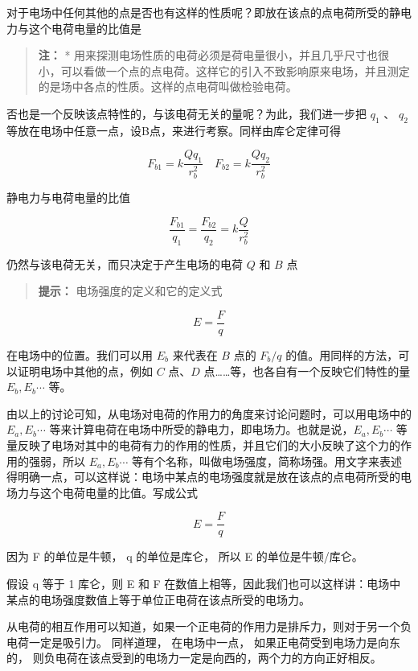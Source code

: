 对于电场中任何其他的点是否也有这样的性质呢？即放在该点的点电荷所受的静电力与这个电荷电量的比值是

\begin{quote}
\textbf{注：} *
用来探测电场性质的电荷必须是荷电量很小，并且几乎尺寸也很小，可以看做一个点的点电荷。这样它的引入不致影响原来电场，并且测定的是场中各点的性质。这样的点电荷叫做检验电荷。
\end{quote}

否也是一个反映该点特性的，与该电荷无关的量呢？为此，我们进一步把
\(q_{1}\) 、 \(q_{2}\)
等放在电场中任意一点，设B点，来进行考察。同样由库仑定律可得

\[
F_{b 1} = k \frac{Q q_{1}}{r_{b}^{2}} \quad F_{b 2} = k \frac{Q q_{2}}{r_{b}^{2}}
\]

静电力与电荷电量的比值

\[
\frac{F_{b 1}}{q_{1}} = \frac{F_{b 2}}{q_{2}} = k \frac{Q}{r_{b}^{2}}
\]

仍然与该电荷无关，而只决定于产生电场的电荷 \(Q\) 和 \(B\) 点

\begin{quote}
\textbf{提示：} 电场强度的定义和它的定义式
\end{quote}

\[
E = \frac{F}{q}
\]

在电场中的位置。我们可以用 \(E_{b}\) 来代表在 \(B\) 点的 \(F_{b} / q\)
的值。用同样的方法，可以证明电场中其他的点，例如 \(C\) 点、\(D\)
点\ldots\ldots 等，也各自有一个反映它们特性的量 \(E_{b}, E_{b} \cdots\)
等。

由以上的讨论可知，从电场对电荷的作用力的角度来讨论问题时，可以用电场中的
\(E_{a}, E_{b} \cdots\)
等来计算电荷在电场中所受的静电力，即电场力。也就是说，\(E_{a}, E_{b} \cdots\)
等量反映了电场对其中的电荷有力的作用的性质，并且它们的大小反映了这个力的作用的强弱，所以
\(E_{a}, E_{b} \cdots\)
等有个名称，叫做电场强度，简称场强。用文字来表述得明确一点，可以这样说：电场中某点的电场强度就是放在该点的点电荷所受的电场力与这个电荷电量的比值。写成公式

\[
E = \frac{F}{q} \tag{1.2}
\]

因为 F 的单位是牛顿， q 的单位是库仑， 所以 E 的单位是牛顿/库仑。

假设 q 等于 1 库仑，则 E 和 F
在数值上相等，因此我们也可以这样讲：电场中某点的电场强度数值上等于单位正电荷在该点所受的电场力。

从电荷的相互作用可以知道，如果一个正电荷的作用力是排斥力，则对于另一个负电荷一定是吸引力。
同样道理， 在电场中一点， 如果正电荷受到电场力是向东的，
则负电荷在该点受到的电场力一定是向西的，两个力的方向正好相反。

